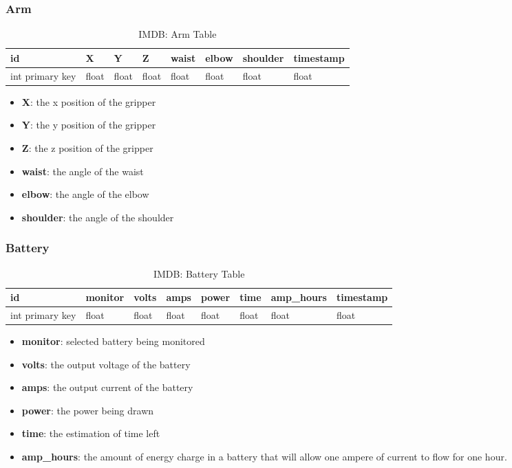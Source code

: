 \subsubsection{Arm}

\begin{table}[!htb]
\centering
\begin{tabular}{|l|l|l|l|l|l|l|l|}
\hline
id              & X     & Y     & Z     & waist & elbow & shoulder & timestamp \\ \hline
int primary key & float & float & float & float & float & float    & float \\ \hline
\end{tabular}
\caption{IMDB: Arm Table}
\label{tab:db-arm}
\end{table}

\begin{itemize}
\item{\textbf{X}}: the x position of the gripper 
\item{\textbf{Y}}: the y position of the gripper
\item{\textbf{Z}}: the z position of the gripper
\item{\textbf{waist}}: the angle of the waist
\item{\textbf{elbow}}: the angle of the elbow
\item{\textbf{shoulder}}: the angle of the shoulder
\end{itemize}

\subsubsection{Battery}

\begin{table}[!htb]
\centering
\begin{tabular}{|l|l|l|l|l|l|l|l|}
\hline
id              & monitor     & volts     & amps     & power & time  & amp\_hours  & timestamp \\ \hline
int primary key & float 	  & float 	  & float    & float & float & float       & float \\ \hline
\end{tabular}
\caption{IMDB: Battery Table}
\label{tab:db-arm}
\end{table}

\begin{itemize}
\item{\textbf{monitor}}: selected battery being monitored
\item{\textbf{volts}}: the output voltage of the battery
\item{\textbf{amps}}: the output current of the battery
\item{\textbf{power}}: the power being drawn
\item{\textbf{time}}: the estimation of time left 
\item{\textbf{amp\_hours}}: the amount of energy charge in a battery that will allow one ampere of current to flow for one hour.
\end{itemize}


